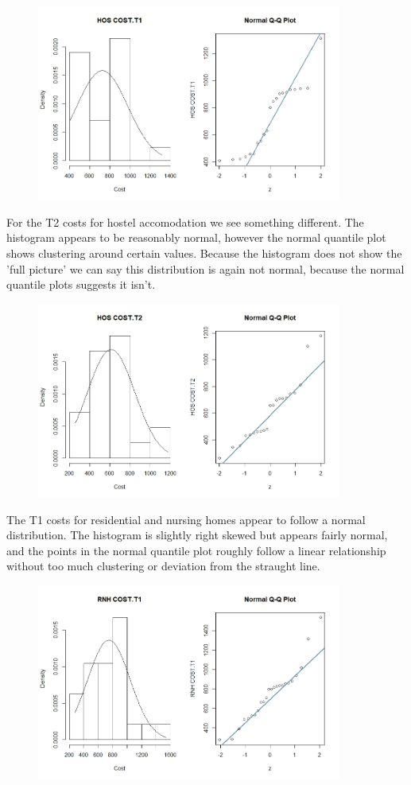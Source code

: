 \documentclass[]{article}
\begin{document}
\begin{figure}[H]
\centering
\includegraphics[width=10cm]{RStudio/jpeg/Norm_HOS_T1.jpeg}
\end{figure}
For the T2 costs for hostel accomodation we see something different. The histogram appears to be reasonably normal, however the normal quantile plot shows clustering around certain values. Because the histogram does not show the 'full picture' we can say this distribution is again not normal, because the normal quantile plots suggests it isn't.
\begin{figure}[H]
\centering
\includegraphics[width=10cm]{RStudio/jpeg/Norm_HOS_T2.jpeg}
\end{figure}
\newpage
The T1 costs for residential and nursing homes appear to follow a normal distribution. The histogram is slightly right skewed but appears fairly normal, and the points in the normal quantile plot roughly follow a linear relationship without too much clustering or deviation from the straught line.
\begin{figure}[H]
\centering
\includegraphics[width=10cm]{RStudio/jpeg/Norm_RNH_T1.jpeg}
\end{figure}
\end{document}

